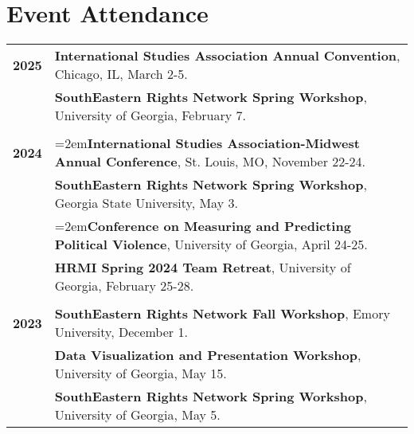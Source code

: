 \documentclass[letterpaper,12pt]{article}
\begin{document}
\section{Event Attendance}
\begin{xltabular}{\dimexpr\textwidth-0in}{p{.85in}X}
\textbf{2025} & \textbf{International Studies Association Annual Convention}, Chicago, IL, March 2-5.\\
                     & \textbf{SouthEastern Rights Network Spring Workshop}, University of Georgia, February 7.\\ \\
\textbf{2024} & \hangindent=2em\textbf{International Studies Association-Midwest Annual Conference}, St. Louis, MO, November 22-24.\\
                     &  \textbf{SouthEastern Rights Network Spring Workshop}, Georgia State University, May 3.\\
                     &  \hangindent=2em\textbf{Conference on Measuring and Predicting Political Violence}, University of Georgia, April 24-25.\\
                     &  \textbf{HRMI Spring 2024 Team Retreat}, University of Georgia, February 25-28.\\ \\
\textbf{2023} &  \textbf{SouthEastern Rights Network Fall Workshop}, Emory University, December 1.\\
                     &  \textbf{Data Visualization and Presentation Workshop}, University of Georgia, May 15.\\
                     &  \textbf{SouthEastern Rights Network Spring Workshop}, University of Georgia, May 5.
\end{xltabular}

\end{document}
